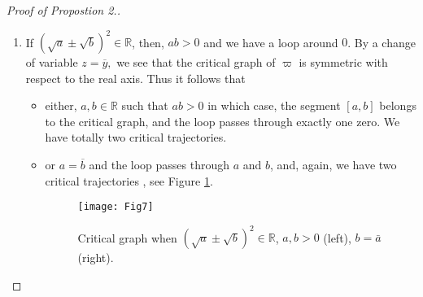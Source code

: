 \documentclass[12pt]{amsart}
\begin{document}
\begin{proof}[Proof of Propostion 2.]
\begin{enumerate}
\item If $\left( \sqrt{a}\pm \sqrt{b}\right) ^{2}\in 
\mathbb{R}
$, then, $ab>0$ and we have a loop around $0$. By a change of variable $z=\overline{y},$ we see that the critical graph of $\varpi $ is symmetric with
respect to the real axis. Thus it follows that

\begin{itemize}
\item either, $a,b\in 
\mathbb{R}
$ such that $ab>0$ in which case, the segment $\left[ a,b\right] $ belongs
to the critical graph, and the loop passes through exactly one zero. We have
totally two critical trajectories.

\item or $a=\overline{b}$ and the loop passes through $a$ and $b$, and,
again, we have two critical trajectories \cite{Kuijlaars}, see Figure \ref{Fig7}.
 \begin{figure}[h]
\begin{center}
\texttt{[image: Fig7]}
\caption[le titre]{ Critical graph when $(\sqrt{a}\pm \sqrt{b})^2\in \mathbb{R}$, $a,b > 0$ (left), $b=\bar{a}$ (right).}
\label{Fig7}
\end{center}
\end{figure}
\end{itemize}


\end{enumerate}
\end{proof}
\end{document}
